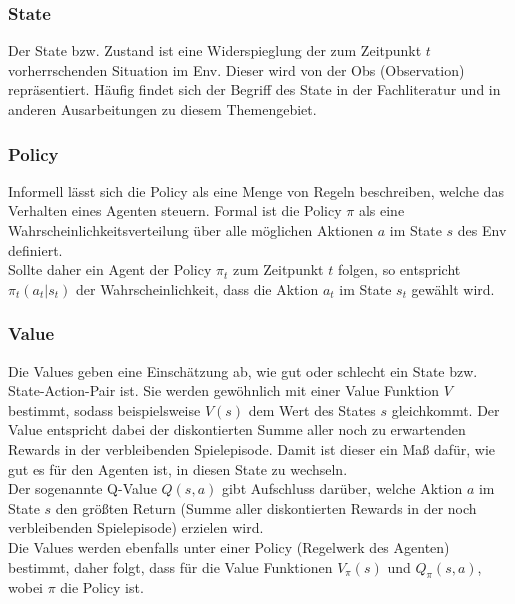 \subsubsection{State} \label{subsubsec:Grundlagen_State}
Der State bzw. Zustand ist eine Widerspieglung der zum Zeitpunkt $t$ vorherrschenden Situation im Env. 
Dieser wird von der Obs (Observation) repräsentiert. Häufig findet sich der Begriff des State in der Fachliteratur und in anderen Ausarbeitungen zu diesem Themengebiet. \citep[s. 381 ff.]{Sutton1998}

\subsubsection{Policy} \label{subsubsec:Grundlagen_Policy}
Informell lässt sich die Policy als eine Menge von Regeln beschreiben, welche das Verhalten eines Agenten steuern. Formal ist die Policy $\pi$ als eine Wahrscheinlichkeitsverteilung über alle möglichen Aktionen $a$ im State $s$ des Env definiert. \citep[S. 44]{DRL_Lapan}\\
Sollte daher ein Agent der Policy $\pi_{t}$ zum Zeitpunkt $t$ folgen, so entspricht $\pi_{t}(a_t|s_t)$ der Wahrscheinlichkeit, dass die Aktion $a_t$ im State $s_t$ gewählt wird. \citep[S. 45 ff.]{Sutton1998}

\subsubsection{Value} \label{subsubsec:Grundlagen_Value}
Die Values geben eine Einschätzung ab, wie gut oder schlecht ein State bzw. State-Action-Pair ist. Sie werden gewöhnlich mit einer Value Funktion $V$ bestimmt, sodass beispielsweise $V(s)$ dem Wert des States $s$ gleichkommt. Der Value entspricht dabei der diskontierten Summe aller noch zu erwartenden Rewards in der verbleibenden Spielepisode. Damit ist dieser ein Maß dafür, wie gut es für den Agenten ist, in diesen State zu wechseln.\\
Der sogenannte Q-Value $Q(s,a)$ gibt Aufschluss darüber, welche Aktion $a$ im State $s$ den größten Return (Summe aller diskontierten Rewards in der noch verbleibenden Spielepisode) erzielen wird.\\
Die Values werden ebenfalls unter einer Policy (Regelwerk des Agenten) bestimmt, daher folgt, dass für die Value Funktionen $V_\pi(s)$ und $Q_\pi(s,a)$, wobei $\pi$ die Policy ist. \citep[S. 46]{Sutton1998}

